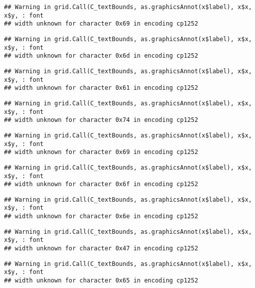 \documentclass[
]{article}
\begin{document}
\begin{verbatim}
## Warning in grid.Call(C_textBounds, as.graphicsAnnot(x$label), x$x, x$y, : font
## width unknown for character 0x69 in encoding cp1252
\end{verbatim}

\begin{verbatim}
## Warning in grid.Call(C_textBounds, as.graphicsAnnot(x$label), x$x, x$y, : font
## width unknown for character 0x6d in encoding cp1252
\end{verbatim}

\begin{verbatim}
## Warning in grid.Call(C_textBounds, as.graphicsAnnot(x$label), x$x, x$y, : font
## width unknown for character 0x61 in encoding cp1252
\end{verbatim}

\begin{verbatim}
## Warning in grid.Call(C_textBounds, as.graphicsAnnot(x$label), x$x, x$y, : font
## width unknown for character 0x74 in encoding cp1252
\end{verbatim}

\begin{verbatim}
## Warning in grid.Call(C_textBounds, as.graphicsAnnot(x$label), x$x, x$y, : font
## width unknown for character 0x69 in encoding cp1252
\end{verbatim}

\begin{verbatim}
## Warning in grid.Call(C_textBounds, as.graphicsAnnot(x$label), x$x, x$y, : font
## width unknown for character 0x6f in encoding cp1252
\end{verbatim}

\begin{verbatim}
## Warning in grid.Call(C_textBounds, as.graphicsAnnot(x$label), x$x, x$y, : font
## width unknown for character 0x6e in encoding cp1252
\end{verbatim}

\begin{verbatim}
## Warning in grid.Call(C_textBounds, as.graphicsAnnot(x$label), x$x, x$y, : font
## width unknown for character 0x47 in encoding cp1252
\end{verbatim}

\begin{verbatim}
## Warning in grid.Call(C_textBounds, as.graphicsAnnot(x$label), x$x, x$y, : font
## width unknown for character 0x65 in encoding cp1252
\end{verbatim}
\end{document}
